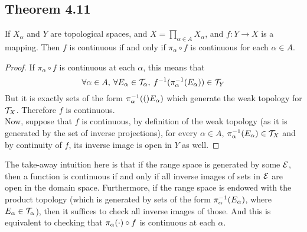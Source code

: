 \documentclass[../../main.tex]{subfiles}
\begin{document}
\subsection{Theorem 4.11}
\begin{wts}
    If $X_\alpha$ and $Y$ are topological spaces, and $X = \prod_{\alpha\in A}X_\alpha$, and $f:Y\to X$ is a mapping. Then $f$ is continuous if and only if $\pi_\alpha\circ f$ is continuous for each $\alpha\in A$.
\end{wts}
\begin{proof}
    If $\pi_\alpha\circ f$ is continuous at each $\alpha$, this means that
    \[
    \forall \alpha\in A, \:\forall E_\alpha\in\mathcal{T}_\alpha,\: f^{-1}(\pi_{\alpha}^{-1}({E_\alpha}))\in \mathcal{T}_Y
    \]
    But it is exactly sets of the form $\pi_{\alpha}^{-1}({(})E_\alpha)$ which generate the weak topology for $\mathcal{T}_X$. Therefore $f$ is continuous.\\
    
    Now, suppose that $f$ is continuous, by definition of the weak topology (as it is generated by the set of inverse projections), for every $\alpha\in A$, $\pi_{\alpha}^{-1}({E_\alpha})\in \mathcal{T}_X$ and by continuity of $f$, its inverse image is open in $Y$ as well.
\end{proof}
\remark The take-away intuition here is that if the range space is generated by some $\mathcal{E}$, then a function is continuous if and only if all inverse images of sets in $\mathcal{E}$ are open in the domain space. Furthermore, if the range space is endowed with the product topology (which is generated by sets of the form $\pi_{\alpha}^{-1}({E_\alpha})$, where $E_\alpha\in \mathcal{T}_\alpha$), then it suffices to check all inverse images of those. And this is equivalent to checking that $\pi_{\alpha}({\cdot})\circ f$ is continuous at each $\alpha$.
\end{document}
